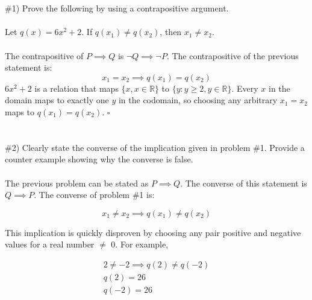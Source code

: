 \documentclass[11pt]{article}
\begin{document}

\section{}

\#1) Prove the following by using a contrapositive argument.
\paragraph{}
Let $q(x) = 6x^2+2$.
If $q(x_1)\ne q(x_2)$, then $x_1 \ne x_2$.
\paragraph{}
The contrapositive of $P \implies Q$ is $\neg Q \implies \neg P$.
The contrapositive of the previous statement is:
\begin{equation}
	x_1=x_2 \implies q(x_1) = q(x_2)
\end{equation}
$6x^2+2$ is a relation that maps $\{x, x \in \mathbb{R}\}$ to $\{y:y \ge 2, y \in \mathbb{R}\}.$
Every $x$ in the domain maps to exactly one $y$ in the codomain, so choosing any arbitrary $x_1 = x_2$ maps to $q(x_1)=q(x_2)$.
$\square$

\section{}

\#2) Clearly state the converse of the implication given in problem \#1.
Provide a counter example showing why the converse is false.
\paragraph{}
The previous problem can be stated as $P \implies Q$.
The converse of this statement is $Q \implies P$.
The converse of problem \#1 is:

\begin{equation}
	x_1 \ne x_2 \implies q(x_1) \ne q(x_2)
\end{equation}

This implication is quickly disproven by choosing any pair positive and negative values for a real number $\ne$ 0.
For example,

\begin{equation}
	\begin{aligned}
	2 \ne -2 \implies q(2) \ne q(-2) \\
	q(2) = 26 \\
	q(-2) = 26 \\
	\end{aligned}
\end{equation}
\end{document}
